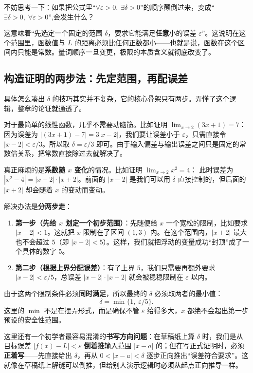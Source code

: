 不妨思考一下：如果把公式里``\(\forall\varepsilon>0,\;\exists\delta>0\)''的顺序颠倒过来，变成``\(\exists\delta>0,\;\forall\varepsilon>0\)'',会发生什么？

这意味着``先选定一个固定的范围 \(\delta\)，要求它能满足\textbf{任意}小的误差 \(\varepsilon\)''。这说明在这个范围里，函数值与 \(L\) 的距离必须比任何正数都小——也就是说，函数在这个区间内只能是常数。量词顺序一旦变更，极限的本质含义就彻底改变了。

\subsection{构造证明的两步法：先定范围，再配误差}

具体怎么凑出 \(\delta\) 的技巧其实并不复杂，它的核心骨架只有两步。弄懂了这个逻辑，整章的论证就通透了。

对于最简单的线性函数，几乎不需要动脑筋。比如证明 \(\lim_{x\to2}(3x+1)=7\)：
因为误差为 \(|(3x+1)-7|=3|x-2|\)，我们要让误差小于 \(\varepsilon\)，只需直接令 \(|x-2|<\varepsilon/3\)。所以取 \(\delta=\varepsilon/3\) 即可。由于输入偏差与输出误差之间只是固定的常数倍关系，把常数直接除过去就解决了。

真正麻烦的是\textbf{系数随 \(x\) 变化}的情况。比如证明 \(\lim_{x\to2}x^2=4\)：
此时误差为 \(|x^2-4|=|x-2|\cdot|x+2|\)。前面的 \(|x-2|\) 是我们可以用 \(\delta\) 直接控制的，但后面的 \(|x+2|\) 却会随着 \(x\) 的变动而变动。

解决办法是\textbf{分两步走}：
\begin{enumerate}
  \item \textbf{第一步（先给 \(x\) 划定一个初步范围）}：先随便给 \(x\) 一个宽松的限制，比如要求 \(|x-2|<1\)。这就把 \(x\) 限制在了区间 \((1,3)\) 内。在这个范围内，\(|x+2|\) 最大也不会超过 \(5\)（即 \(|x+2|<5\)）。这样，我们就把浮动的变量成功``封顶''成了一个具体的数字 \(5\)。
  \item \textbf{第二步（根据上界分配误差）}：有了上界 \(5\)，我们只需要再额外要求 \(|x-2|<\varepsilon/5\)，总误差 \(|x-2|\cdot|x+2|\) 就会被稳稳限制在 \(\varepsilon\) 以内。
\end{enumerate}

由于这两个限制条件必须\textbf{同时满足}，所以最终的 \(\delta\) 必须取两者的最小值：
\[
\delta=\min\{1,\;\varepsilon/5\}.
\]
这里的 \(\min\) 不是在摆弄形式，而是确保不管 \(\varepsilon\) 给得多大，\(x\) 都绝不会超出第一步预设的安全性范围。

这里还有一个初学者最容易混淆的\textbf{书写方向问题}：在草稿纸上算 \(\delta\) 时，我们是从目标误差 \(|f(x)-L|<\varepsilon\) \textbf{倒着推}输入范围 \(|x-a|\) 的；但在写正式证明时，必须\textbf{正着写}——先直接给出 \(\delta\)，再从 \(0<|x-a|<\delta\) 逐步正向推出``误差符合要求''。这就像在草稿纸上解谜可以倒推，但给别人演示逻辑时必须从起点正向推导一样。

